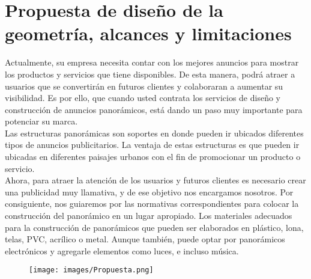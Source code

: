 \documentclass{article}
\begin{document}
\section{Propuesta de diseño de la geometría, alcances y limitaciones}
Actualmente, su empresa necesita contar con los mejores anuncios para mostrar los productos y servicios que tiene disponibles. De esta manera, podrá atraer a usuarios que se convertirán en futuros clientes y colaboraran a aumentar su visibilidad. Es por ello, que cuando usted contrata los servicios de diseño y construcción de anuncios panorámicos, está dando un paso muy importante para potenciar su marca.
\\
Las estructuras panorámicas son soportes en donde pueden ir ubicados diferentes tipos de anuncios publicitarios. La ventaja de estas estructuras es que pueden ir ubicadas en diferentes paisajes urbanos con el fin de promocionar un producto o servicio.
\\
Ahora, para atraer la atención de los usuarios y futuros clientes es necesario crear una publicidad muy llamativa, y de ese objetivo nos encargamos nosotros. Por consiguiente, nos guiaremos por las normativas correspondientes para colocar la construcción del panorámico en un lugar apropiado. Los materiales adecuados para la construcción de panorámicos que pueden ser elaborados en plástico, lona, telas, PVC, acrílico o metal. Aunque también, puede optar por panorámicos electrónicos y agregarle elementos como luces, e incluso música.

\begin{figure}[h] %
    \centering
    \texttt{[image: images/Propuesta.png]} %
    \caption{}
\end{figure}

\newpage
\end{document}
